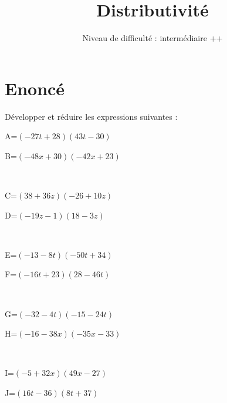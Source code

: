 \documentclass{article}%
\title{Distributivité}%
\author{Niveau de difficulté : intermédiaire ++}%
\date{{}}%
\begin{document}
%
\normalsize%
\pagestyle{empty}%
\maketitle%
\section{Enoncé}%
\label{sec:Enonc}%
Développer et réduire les expressions suivantes :%
\newline%
%
\newline%
%
\begin{minipage}{0.5\textwidth}%
A=$(-27t+28)(43t-30)$\\%
\end{minipage}%
\begin{minipage}{0.5\textwidth}%
B=$(-48x+30)(-42x+23)$\\%
\end{minipage}%
\\%
\begin{minipage}{0.5\textwidth}%
C=$(38+36z)(-26+10z)$\\%
\end{minipage}%
\begin{minipage}{0.5\textwidth}%
D=$(-19z-1)(18-3z)$\\%
\end{minipage}%
\\%
\begin{minipage}{0.5\textwidth}%
E=$(-13-8t)(-50t+34)$\\%
\end{minipage}%
\begin{minipage}{0.5\textwidth}%
F=$(-16t+23)(28-46t)$\\%
\end{minipage}%
\\%
\begin{minipage}{0.5\textwidth}%
G=$(-32-4t)(-15-24t)$\\%
\end{minipage}%
\begin{minipage}{0.5\textwidth}%
H=$(-16-38x)(-35x-33)$\\%
\end{minipage}%
\\%
\begin{minipage}{0.5\textwidth}%
I=$(-5+32x)(49x-27)$\\%
\end{minipage}%
\begin{minipage}{0.5\textwidth}%
J=$(16t-36)(8t+37)$\\%
\end{minipage}%
\end{document}
